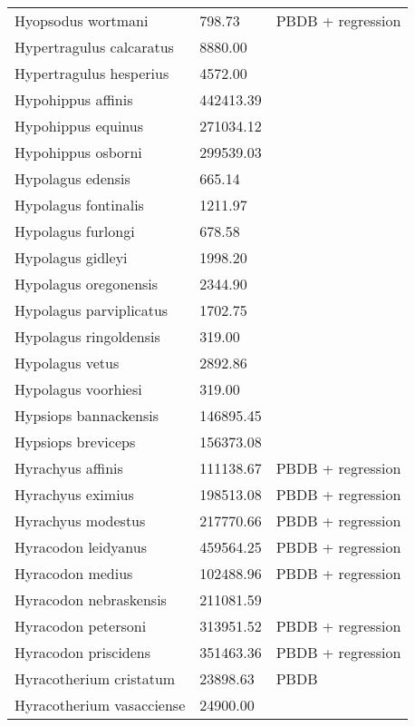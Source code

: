 \begin{center}
\begin{longtable}{p{} p{} p{} }
  Hyopsodus wortmani & 798.73 & PBDB + regression \\ 
  Hypertragulus calcaratus & 8880.00 & \cite{McKenna2011} \\ 
  Hypertragulus hesperius & 4572.00 & \cite{McKenna2011} \\ 
  Hypohippus affinis & 442413.39 & \cite{Tomiya2013} \\ 
  Hypohippus equinus & 271034.12 & \cite{Tomiya2013} \\ 
  Hypohippus osborni & 299539.03 & \cite{Tomiya2013} \\ 
  Hypolagus edensis & 665.14 & \cite{Tomiya2013} \\ 
  Hypolagus fontinalis & 1211.97 & \cite{Tomiya2013} \\ 
  Hypolagus furlongi & 678.58 & \cite{Tomiya2013} \\ 
  Hypolagus gidleyi & 1998.20 & \cite{Tomiya2013} \\ 
  Hypolagus oregonensis & 2344.90 & \cite{Tomiya2013} \\ 
  Hypolagus parviplicatus & 1702.75 & \cite{Tomiya2013} \\ 
  Hypolagus ringoldensis & 319.00 & \cite{McKenna2011} \\ 
  Hypolagus vetus & 2892.86 & \cite{Tomiya2013} \\ 
  Hypolagus voorhiesi & 319.00 & \cite{McKenna2011} \\ 
  Hypsiops bannackensis & 146895.45 & \cite{Wang1999} \\ 
  Hypsiops breviceps & 156373.08 & \cite{Tomiya2013} \\ 
  Hyrachyus affinis & 111138.67 & PBDB + regression \\ 
  Hyrachyus eximius & 198513.08 & PBDB + regression \\ 
  Hyrachyus modestus & 217770.66 & PBDB + regression \\ 
  Hyracodon leidyanus & 459564.25 & PBDB + regression \\ 
  Hyracodon medius & 102488.96 & PBDB + regression \\ 
  Hyracodon nebraskensis & 211081.59 & \cite{Tomiya2013} \\ 
  Hyracodon petersoni & 313951.52 & PBDB + regression \\ 
  Hyracodon priscidens & 351463.36 & PBDB + regression \\ 
  Hyracotherium cristatum & 23898.63 & PBDB \\ 
  Hyracotherium vasacciense & 24900.00 & \cite{MacFadden1986} \\ 

\end{longtable}
\end{center}
